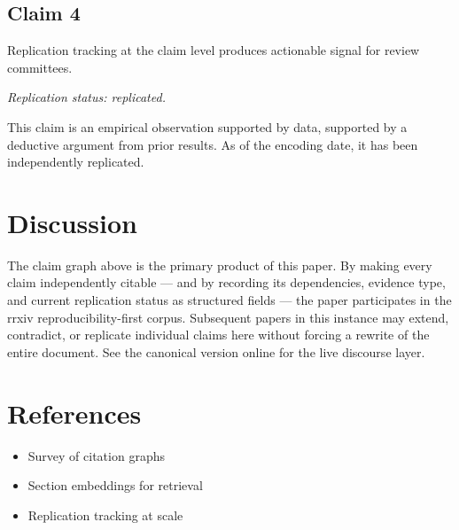 \documentclass{rrxiv}
\begin{document}
\subsection*{Claim 4}
\begin{claim}[Claim 4]
\label{claim:c4}
Replication tracking at the claim level produces actionable signal for review committees.

\emph{Replication status: replicated.}
\end{claim}
This claim is an empirical observation supported by data, supported by a deductive argument from prior results. As of the encoding date, it has been independently replicated.

\section{Discussion}
The claim graph above is the primary product of this paper. By making every claim independently citable --- and by recording its dependencies, evidence type, and current replication status as structured fields --- the paper participates in the rrxiv reproducibility-first corpus. Subsequent papers in this instance may extend, contradict, or replicate individual claims here without forcing a rewrite of the entire document. See the canonical version online for the live discourse layer.

\section{References}
\begin{itemize}[leftmargin=*]
\item Survey of citation graphs
\item Section embeddings for retrieval
\item Replication tracking at scale
\end{itemize}
\end{document}
